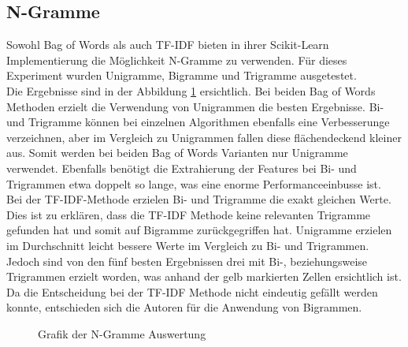 \subsection{N-Gramme}
Sowohl \glqq Bag of Words\grqq{} als auch TF-IDF bieten in ihrer Scikit-Learn Implementierung die Möglichkeit N-Gramme zu verwenden.
Für dieses Experiment wurden Unigramme, Bigramme und Trigramme ausgetestet.\\
Die Ergebnisse sind in der Abbildung \cref{abb:ngram} ersichtlich.
Bei beiden \glqq Bag of Words\grqq{} Methoden erzielt die Verwendung von Unigrammen die besten Ergebnisse.
Bi- und Trigramme können bei einzelnen Algorithmen ebenfalls eine Verbesserunge verzeichnen, aber im Vergleich zu Unigrammen fallen diese flächendeckend kleiner aus.
Somit werden bei beiden \glqq Bag of Words\grqq{} Varianten nur Unigramme verwendet.
Ebenfalls benötigt die Extrahierung der Features bei Bi- und Trigrammen etwa doppelt so lange, was eine enorme Performanceeinbusse ist.\\
Bei der TF-IDF-Methode erzielen Bi- und Trigramme die exakt gleichen Werte.
Dies ist zu erklären, dass die TF-IDF Methode keine relevanten Trigramme gefunden hat und somit auf Bigramme zurückgegriffen hat.
Unigramme erzielen im Durchschnitt leicht bessere Werte im Vergleich zu Bi- und Trigrammen.
Jedoch sind von den fünf besten Ergebnissen drei mit Bi-, beziehungsweise Trigrammen erzielt worden, was anhand der gelb markierten Zellen ersichtlich ist.
Da die Entscheidung bei der TF-IDF Methode nicht eindeutig gefällt werden konnte, entschieden sich die Autoren für die Anwendung von Bigrammen.
\begin{figure}[H]	
	\setlength{\fboxsep}{0.3pt} 
	\setlength{\fboxrule}{0.3pt} 
	\caption{Grafik der N-Gramme Auswertung}
	\label{abb:ngram}
\end{figure}
